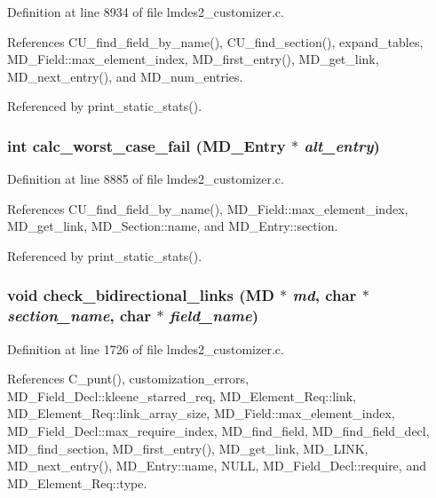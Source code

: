 Definition at line 8934 of file lmdes2\_\-customizer.c.

References CU\_\-find\_\-field\_\-by\_\-name(), CU\_\-find\_\-section(), expand\_\-tables, MD\_\-Field::max\_\-element\_\-index, MD\_\-first\_\-entry(), MD\_\-get\_\-link, MD\_\-next\_\-entry(), and MD\_\-num\_\-entries.

Referenced by print\_\-static\_\-stats().
\subsubsection{\setlength{\rightskip}{0pt plus 5cm}int calc\_\-worst\_\-case\_\-fail (\bf{MD\_\-Entry} $\ast$ {\em alt\_\-entry})}\label{lmdes2__customizer_8c_d0902b41af4b8f27f9e37f303a00cada}




Definition at line 8885 of file lmdes2\_\-customizer.c.

References CU\_\-find\_\-field\_\-by\_\-name(), MD\_\-Field::max\_\-element\_\-index, MD\_\-get\_\-link, MD\_\-Section::name, and MD\_\-Entry::section.

Referenced by print\_\-static\_\-stats().
\subsubsection{\setlength{\rightskip}{0pt plus 5cm}void check\_\-bidirectional\_\-links (\bf{MD} $\ast$ {\em md}, char $\ast$ {\em section\_\-name}, char $\ast$ {\em field\_\-name})}\label{lmdes2__customizer_8c_6740c00001d924e1656171ce296a54d0}




Definition at line 1726 of file lmdes2\_\-customizer.c.

References C\_\-punt(), customization\_\-errors, MD\_\-Field\_\-Decl::kleene\_\-starred\_\-req, MD\_\-Element\_\-Req::link, MD\_\-Element\_\-Req::link\_\-array\_\-size, MD\_\-Field::max\_\-element\_\-index, MD\_\-Field\_\-Decl::max\_\-require\_\-index, MD\_\-find\_\-field, MD\_\-find\_\-field\_\-decl, MD\_\-find\_\-section, MD\_\-first\_\-entry(), MD\_\-get\_\-link, MD\_\-LINK, MD\_\-next\_\-entry(), MD\_\-Entry::name, NULL, MD\_\-Field\_\-Decl::require, and MD\_\-Element\_\-Req::type.

